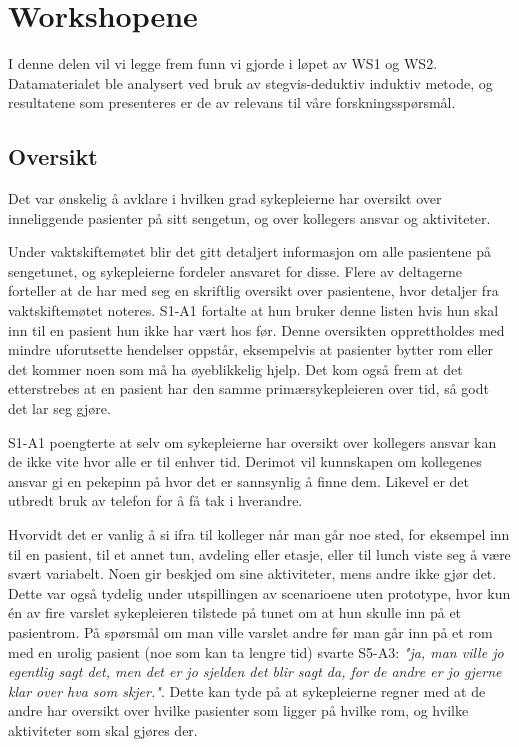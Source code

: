 \section{Workshopene}
\label{ws}
I denne delen vil vi legge frem funn vi gjorde i løpet av WS1 og WS2. Datamaterialet ble analysert ved bruk av stegvis-deduktiv induktiv metode, og resultatene som presenteres er de av relevans til våre forskningsspørsmål.

\subsection{Oversikt}
Det var ønskelig å avklare i hvilken grad sykepleierne har oversikt over inneliggende pasienter på sitt sengetun, og over kollegers ansvar og aktiviteter.

\noindent
Under vaktskiftemøtet blir det gitt detaljert informasjon om alle pasientene på sengetunet, og sykepleierne fordeler ansvaret for disse. Flere av deltagerne forteller at de har med seg en skriftlig oversikt over pasientene, hvor detaljer fra vaktskiftemøtet noteres. S1-A1 fortalte at hun bruker denne listen hvis hun skal inn til en pasient hun ikke har vært hos før. Denne oversikten opprettholdes med mindre uforutsette hendelser oppstår, eksempelvis at pasienter bytter rom eller det kommer noen som må ha øyeblikkelig hjelp. Det kom også frem at det etterstrebes at en pasient har den samme primærsykepleieren over tid, så godt det lar seg gjøre.

\noindent
S1-A1 poengterte at selv om sykepleierne har oversikt over kollegers ansvar kan de ikke vite hvor alle er til enhver tid. Derimot vil kunnskapen om kollegenes ansvar gi en pekepinn på hvor det er sannsynlig å finne dem. Likevel er det utbredt bruk av telefon for å få tak i hverandre. 

\noindent
Hvorvidt det er vanlig å si ifra til kolleger når man går noe sted, for eksempel inn til en pasient, til et annet tun, avdeling eller etasje, eller til lunch viste seg å være svært variabelt. Noen gir beskjed om sine aktiviteter, mens andre ikke gjør det.
Dette var også tydelig under utspillingen av scenarioene uten prototype, hvor kun én av fire varslet sykepleieren tilstede på tunet om at hun skulle inn på et pasientrom. På spørsmål om man ville varslet andre før man går inn på et rom med en urolig pasient (noe som kan ta lengre tid) svarte S5-A3: \emph{"ja, man ville jo egentlig sagt det, men det er jo sjelden det blir sagt da, for de andre er jo gjerne klar over hva som skjer."}. Dette kan tyde på at sykepleierne regner med at de andre har oversikt over hvilke pasienter som ligger på hvilke rom, og hvilke aktiviteter som skal gjøres der.

